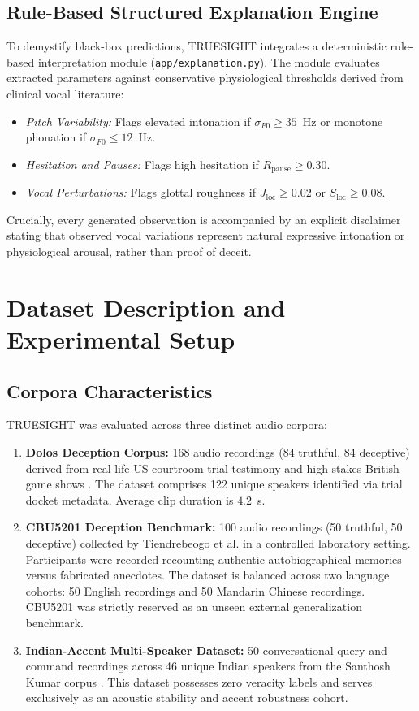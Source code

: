 \documentclass[conference]{IEEEtran}
\begin{document}
\subsection{Rule-Based Structured Explanation Engine}
To demystify black-box predictions, TRUESIGHT integrates a deterministic rule-based interpretation module (\texttt{app/explanation.py}). The module evaluates extracted parameters against conservative physiological thresholds derived from clinical vocal literature:
\begin{itemize}
    \item \textit{Pitch Variability:} Flags elevated intonation if $\sigma_{F0} \ge 35$~Hz or monotone phonation if $\sigma_{F0} \le 12$~Hz.
    \item \textit{Hesitation and Pauses:} Flags high hesitation if $R_{\text{pause}} \ge 0.30$.
    \item \textit{Vocal Perturbations:} Flags glottal roughness if $J_{\text{loc}} \ge 0.02$ or $S_{\text{loc}} \ge 0.08$.
\end{itemize}
Crucially, every generated observation is accompanied by an explicit disclaimer stating that observed vocal variations represent natural expressive intonation or physiological arousal, rather than proof of deceit.

\section{Dataset Description and Experimental Setup}

\subsection{Corpora Characteristics}
TRUESIGHT was evaluated across three distinct audio corpora:
\begin{enumerate}
    \item \textbf{Dolos Deception Corpus:} 168 audio recordings (84 truthful, 84 deceptive) derived from real-life US courtroom trial testimony and high-stakes British game shows \cite{perezrosas2015deception}. The dataset comprises 122 unique speakers identified via trial docket metadata. Average clip duration is $4.2$~s.
    \item \textbf{CBU5201 Deception Benchmark:} 100 audio recordings (50 truthful, 50 deceptive) collected by Tiendrebeogo et al. \cite{tiendrebeogo2022cbu5201} in a controlled laboratory setting. Participants were recorded recounting authentic autobiographical memories versus fabricated anecdotes. The dataset is balanced across two language cohorts: 50 English recordings and 50 Mandarin Chinese recordings. CBU5201 was strictly reserved as an unseen external generalization benchmark.
    \item \textbf{Indian-Accent Multi-Speaker Dataset:} 50 conversational query and command recordings across 46 unique Indian speakers from the Santhosh Kumar corpus \cite{santhosh2023indianaccent}. This dataset possesses zero veracity labels and serves exclusively as an acoustic stability and accent robustness cohort.
\end{enumerate}
\end{document}
